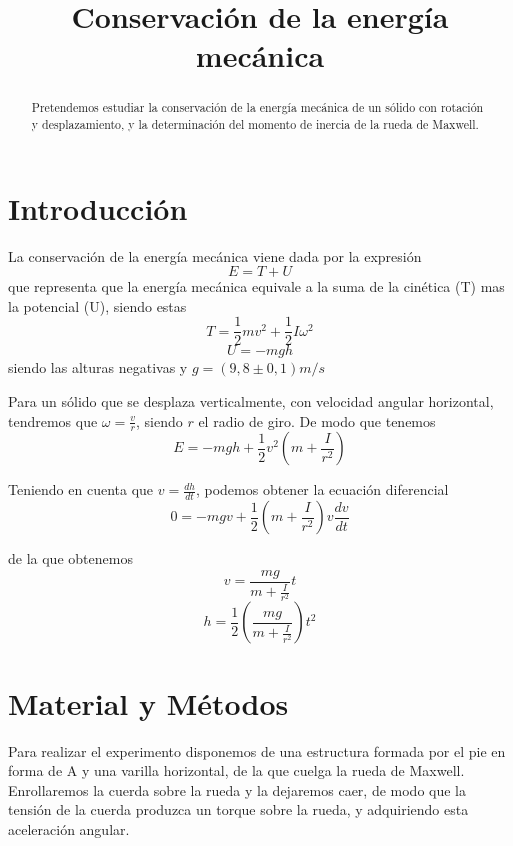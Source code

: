 \documentclass[a4paper,12pt,spanish]{article}
\begin{document}
	
	
	\title{Conservación de la energía mecánica}
	
	\date{}
	
	\maketitle
	
	
	
	\begin{abstract} %
		
		
		Pretendemos estudiar la conservación de la energía mecánica de un sólido con rotación y desplazamiento, y la determinación del momento de inercia de la rueda de Maxwell.
		
		
		
	\end{abstract}
	
	\section{Introducción}
	
	La conservación de la energía mecánica viene dada por la expresión 
	\[ E= T+U\]
	que representa que la energía mecánica equivale a la suma de la cinética (T) mas la potencial (U), siendo estas 
	\[T= \frac{1}{2}mv^2 + \frac{1}{2}I\omega^2\]
	\[U = - m  g h\]
	siendo las alturas negativas y $g=(9,8\pm 0,1) \si{m/s}$
	
	Para un sólido que se desplaza verticalmente, con velocidad angular horizontal, tendremos que $\omega = \frac{v}{r}$, siendo $r$ el radio de giro. De modo que tenemos
	\[E = -mgh + \frac{1}{2}v^2(m+\frac{I}{r^2})\]
	
	Teniendo en cuenta que $v = \frac{dh}{dt}$, podemos obtener la ecuación diferencial
	\[0=-mgv + \frac{1}{2}(m+\frac{I}{r^2})v\frac{dv}{dt}\]
	
	de la que obtenemos
	\[v= \frac{mg}{m+\frac{I}{r^2}}t\]
	\[h= \frac{1}{2}\left(\frac{mg}{m+\frac{I}{r^2}}\right)t^2\]
	
	
	\section{Material y Métodos}
	
	
	
	Para realizar el experimento disponemos de una estructura formada por el pie en forma de A y una varilla horizontal, de la que cuelga la rueda de Maxwell.
	Enrollaremos la cuerda sobre la rueda y la dejaremos caer, de modo que la tensión de la cuerda produzca un torque sobre la rueda, y adquiriendo esta aceleración angular.
	
\end{document}
